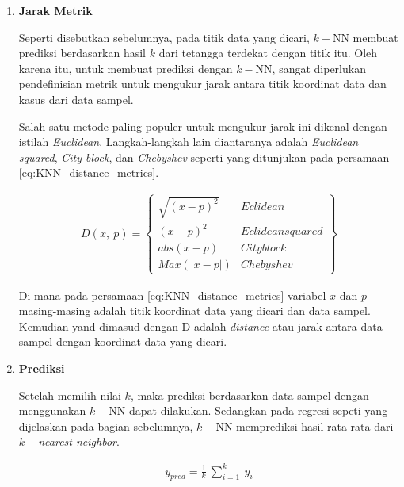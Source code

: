 \begin{enumerate}[label=\textbf{\alph*).}]
	\item \textbf{Jarak Metrik}
	
	Seperti disebutkan sebelumnya, pada titik data yang dicari, $k-$NN membuat prediksi berdasarkan hasil $k$ dari tetangga terdekat dengan titik itu. Oleh karena itu, untuk membuat prediksi dengan $k-$NN, sangat diperlukan pendefinisian metrik untuk mengukur jarak antara titik koordinat data dan kasus dari data sampel. 
	\vspace{1ex}
	
	Salah satu metode paling populer untuk mengukur jarak ini dikenal dengan istilah \textit{Euclidean}. Langkah-langkah lain diantaranya adalah \textit{Euclidean squared}, \textit{City-block}, dan \textit{Chebyshev} seperti yang ditunjukan pada persamaan \ref{eq:KNN_distance_metrics}.
	\vspace{1ex}
	
	\begin{equation}\label{eq:KNN_distance_metrics}
	\begin{split}
	D(x,\ p) =
	\begin{Bmatrix}
	\sqrt{(x - p)^{2}} & Eclidean\\
	(x - p)^{2} & Eclidean squared\\
	abs(x - p) & Cityblock\\
	Max(|x - p|) & Chebyshev
	\end{Bmatrix}
	\end{split}
	\end{equation}
	
	Di mana pada persamaan \ref{eq:KNN_distance_metrics} variabel $x$ dan $p$ masing-masing adalah titik koordinat data yang dicari dan data sampel. Kemudian yand dimasud dengan D adalah \textit{distance} atau jarak antara data sampel dengan koordinat data yang dicari.
	\vspace{1ex}
	
	\item \textbf{Prediksi}
	
	Setelah memilih nilai $k$, maka prediksi berdasarkan data sampel dengan menggunakan $k-$NN dapat dilakukan. Sedangkan pada regresi sepeti yang dijelaskan pada bagian sebelumnya, $k-$NN memprediksi hasil rata-rata dari $k-$\textit{nearest neighbor}.
	
	\begin{equation}\label{eq: KNN_prediction}
	\begin{split}
	y_{pred} = \frac{1}{k}\ \sum_{i = 1}^{k}\ y_{i}
	\end{split}
	\end{equation}
	

\end{enumerate}
